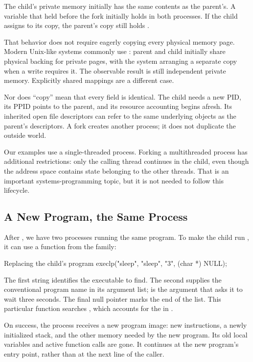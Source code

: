 \documentclass[11pt]{article}
\begin{document}
The child's private memory initially has the same contents as the parent's.
A variable that held  before the fork initially holds  in both processes.
If the child assigns  to its copy, the parent's copy still holds .

That behavior does not require eagerly copying every physical memory page.
Modern Unix-like systems commonly use : parent and child initially share physical backing for private pages, with the system arranging a separate copy when a write requires it.
The observable result is still independent private memory.
Explicitly shared mappings are a different case.

Nor does ``copy'' mean that every field is identical.
The child needs a new PID, its PPID points to the parent, and its resource accounting begins afresh.
Its inherited open file descriptors can refer to the same underlying objects as the parent's descriptors.
A fork creates another process; it does not duplicate the outside world.

Our examples use a single-threaded process.
Forking a multithreaded process has additional restrictions: only the calling thread continues in the child, even though the address space contains state belonging to the other threads.
That is an important systems-programming topic, but it is not needed to follow this lifecycle.

\subsection{A New Program, the Same Process}

After , we have two processes running the same program.
To make the child run , it can use a function from the  family:

\begin{codeblock}[unbreakable,listingopts={language=C}]{Replacing the child's program}
execlp("sleep", "sleep", "3", (char *) NULL);
\end{codeblock}

The first string identifies the executable to find.
The second supplies the conventional program name in its argument list;  is the argument that asks it to wait three seconds.
The final null pointer marks the end of the list.
This particular function searches , which accounts for the  in .

On success, the process receives a new program image: new instructions, a newly initialized stack, and the other memory needed by the new program.
Its old local variables and active function calls are gone.
It continues at the new program's entry point, rather than at the next line of the caller.
\end{document}
